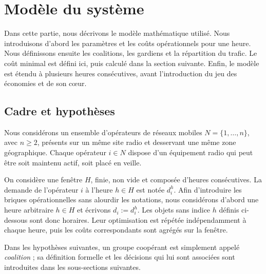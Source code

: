 \section{Modèle du système}
\label{sec:modele_systeme}

Dans cette partie, nous décrivons le modèle mathématique utilisé. Nous
introduisons d'abord les paramètres et les coûts opérationnels pour une heure.
Nous définissons ensuite les coalitions, les gardiens et la répartition du
trafic. Le coût minimal est défini ici, puis calculé dans la section suivante.
Enfin, le modèle est étendu à plusieurs heures consécutives, avant
l'introduction du jeu des économies et de son cœur.


\subsection{Cadre et hypothèses}

Nous considérons un ensemble d'opérateurs de réseaux mobiles
\(N=\{1,\dots,n\}\), avec \(n\geqslant2\), présents sur un même site radio et
desservant une même zone géographique. Chaque opérateur \(i\in N\) dispose
d'un équipement radio qui peut être soit maintenu actif, soit placé en veille.

On considère une fenêtre \(H\), finie, non vide et composée
d'heures consécutives. La demande de l'opérateur \(i\) à l'heure \(h\in H\)
est notée \(d_i^h\). Afin
d'introduire les briques opérationnelles sans alourdir les notations, nous
considérons d'abord une heure arbitraire \(h\in H\) et écrivons
\(d_i:=d_i^h\). Les objets sans indice \(h\) définis ci-dessous sont donc
horaires. Leur optimisation est répétée indépendamment à chaque heure, puis
les coûts correspondants sont agrégés sur la fenêtre.

Dans les hypothèses suivantes, un groupe coopérant est simplement appelé
\emph{coalition} ; sa définition formelle et les décisions qui lui sont
associées sont introduites dans les sous-sections suivantes.

